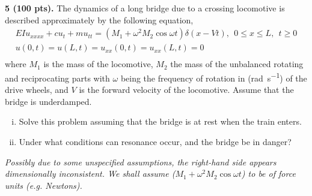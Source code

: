 \begin{problem}
    \textbf{5 (100 pts).}
    The dynamics of a long bridge due to a crossing locomotive is described approximately by the following equation,
    \begin{equation}
    \begin{gathered}
        EIu_{xxxx} + cu_t + mu_{tt} = (M_1 + \omega^2 M_2 \cos\omega t) \delta(x - Vt), ~~ 0 \leq x \leq L, ~~ t \geq 0 \\
        u(0, t) = u(L, t) = u_{xx}(0, t) = u_{xx}(L, t) = 0 \\
    \end{gathered}
    \end{equation}
    where $M_1$ is the mass of the locomotive, $M_2$ the mass of the unbalanced rotating and reciprocating parts with $\omega$ being the frequency of rotation in (\si{\radian\per\s}) of the drive wheels, and $V$ is the forward velocity of the locomotive. 
    Assume that the bridge is underdamped.
    \begin{enumerate}[(i)]
        \item {
            Solve this problem assuming that the bridge is at rest when the train enters.
        }
        \item {
            Under what conditions can resonance occur, and the bridge be in danger?
        }
    \end{enumerate}
\end{problem}
\emph{Possibly due to some unspecified assumptions, the right-hand side appears dimensionally inconsistent. 
We shall assume ($M_1 + \omega^2 M_2 \cos\omega t$) to be of force units (e.g. Newtons).}
